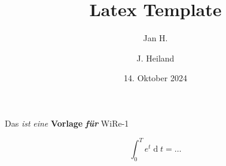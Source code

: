 \documentclass[12pt]{scrartcl}
\author{Jan H. \and J. Heiland}
\title{Latex Template}
\date{14. Oktober 2024}
\begin{document}
\maketitle

Das \emph{ist} \textit{eine} \textbf{Vorlage} \textit{\textbf{f\"ur}}
{\scriptsize{WiRe-1}}

\begin{equation}
  \int_0^T e^t \operatorname{d}t = \dotsc
\end{equation}
\end{document}
